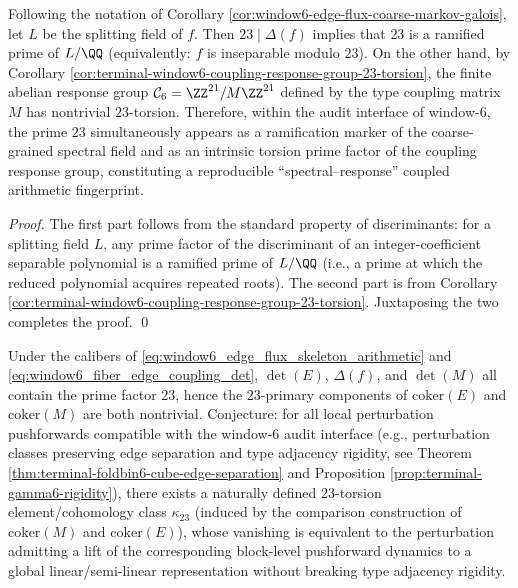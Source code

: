 \begin{corollary}\label{cor:window6-prime23-spectral-response}
Following the notation of Corollary \ref{cor:window6-edge-flux-coarse-markov-galois}, let \(L\) be the splitting field of \(f\).
Then \(23\mid \Delta(f)\) implies that \(23\) is a ramified prime of \(L/\QQ\) (equivalently: \(f\) is inseparable modulo \(23\)).
On the other hand, by Corollary \ref{cor:terminal-window6-coupling-response-group-23-torsion},
the finite abelian response group \(\mathcal{C}_6=\ZZ^{21}/M\ZZ^{21}\) defined by the type coupling matrix \(M\) has nontrivial \(23\)-torsion.
Therefore, within the audit interface of window-\(6\), the prime \(23\) simultaneously appears as a ramification marker of the coarse-grained spectral field and as an intrinsic torsion prime factor of the coupling response group, constituting a reproducible ``spectral--response'' coupled arithmetic fingerprint.
\end{corollary}
\begin{proof}
The first part follows from the standard property of discriminants: for a splitting field \(L\), any prime factor of the discriminant of an integer-coefficient separable polynomial is a ramified prime of \(L/\QQ\) (i.e., a prime at which the reduced polynomial acquires repeated roots).
The second part is from Corollary \ref{cor:terminal-window6-coupling-response-group-23-torsion}.
Juxtaposing the two completes the proof. \qed

\end{proof}

\begin{conjecture}\label{conj:window6-23-primary-obstruction-class}
Under the calibers of \eqref{eq:window6_edge_flux_skeleton_arithmetic} and \eqref{eq:window6_fiber_edge_coupling_det},
\(\det(E)\), \(\Delta(f)\), and \(\det(M)\) all contain the prime factor \(23\), hence
the \(23\)-primary components of \(\mathrm{coker}(E)\) and \(\mathrm{coker}(M)\) are both nontrivial.
Conjecture: for all local perturbation pushforwards compatible with the window-\(6\) audit interface (e.g., perturbation classes preserving edge separation and type adjacency rigidity, see Theorem \ref{thm:terminal-foldbin6-cube-edge-separation} and Proposition \ref{prop:terminal-gamma6-rigidity}),
there exists a naturally defined \(23\)-torsion element/cohomology class \(\kappa_{23}\) (induced by the comparison construction of \(\mathrm{coker}(M)\) and \(\mathrm{coker}(E)\)),
whose vanishing is equivalent to the perturbation admitting a lift of the corresponding block-level pushforward dynamics to a global linear/semi-linear representation without breaking type adjacency rigidity.
\end{conjecture}
